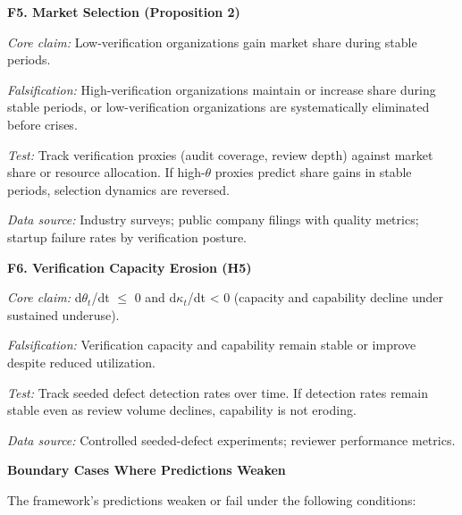 \documentclass[11pt,a4paper]{article}
\begin{document}
\textbf{F5. Market Selection (Proposition 2)}

\emph{Core claim:} Low-verification organizations gain market share during stable periods.

\emph{Falsification:} High-verification organizations maintain or increase share during stable periods, or low-verification organizations are systematically eliminated before crises.

\emph{Test:} Track verification proxies (audit coverage, review depth) against market share or resource allocation. If high-$\theta$ proxies predict share gains in stable periods, selection dynamics are reversed.

\emph{Data source:} Industry surveys; public company filings with quality metrics; startup failure rates by verification posture.

\textbf{F6. Verification Capacity Erosion (H5)}

\emph{Core claim:} d$\theta_{t}$/dt $\leq$ 0 and d$\kappa_{t}$/dt < 0 (capacity and capability decline under sustained underuse).

\emph{Falsification:} Verification capacity and capability remain stable or improve despite reduced utilization.

\emph{Test:} Track seeded defect detection rates over time. If detection rates remain stable even as review volume declines, capability is not eroding.

\emph{Data source:} Controlled seeded-defect experiments; reviewer performance metrics.

\textbf{Boundary Cases Where Predictions Weaken}

The framework's predictions weaken or fail under the following conditions:
\end{document}
